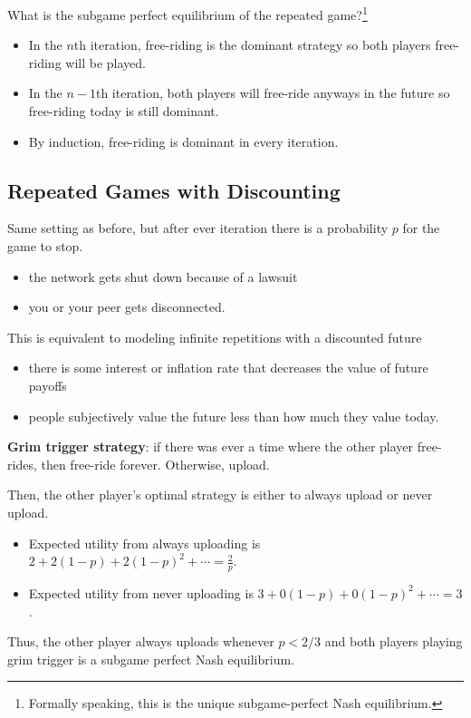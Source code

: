 \documentclass[dvipsnames]{article}
\theoremstyle{definition}
\theoremstyle{remark}
\begin{document}
What is the subgame perfect equilibrium of the repeated game?\footnote{Formally speaking, this is the unique subgame-perfect Nash equilibrium.}
\begin{itemize}
	\item In the $n$th iteration, free-riding is the dominant strategy so both players free-riding will be played.
	\item In the $n-1$th iteration, both players will free-ride anyways in the future so free-riding today is still dominant. 
	\item By induction, free-riding is dominant in every iteration.
\end{itemize}

\subsection{Repeated Games with Discounting}

Same setting as before, but after ever iteration there is a probability $p$ for the game to stop.
\begin{itemize}
	\item the network gets shut down because of a lawsuit
	\item you or your peer gets disconnected.
\end{itemize}
This is equivalent to modeling infinite repetitions with a discounted future
\begin{itemize}
	\item there is some interest or inflation rate that decreases the value of future payoffs
	\item people subjectively value the future less than how much they value today.
\end{itemize}

\textbf{Grim trigger strategy}: if there was ever a time where the other player free-rides, then free-ride forever. Otherwise, upload. 

Then, the other player's optimal strategy is either to always upload or never upload. 
\begin{itemize}
	\item Expected utility from always uploading is $2 + 2(1-p) + 2(1-p)^2 + \cdots = \frac{2}{p}$.
	\item Expected utility from never uploading is $3 + 0(1-p) + 0(1-p)^2 + \cdots = 3$.
\end{itemize}
Thus, the other player always uploads whenever $p < 2/3$ and both players playing grim trigger is a subgame perfect Nash equilibrium.
\end{document}
